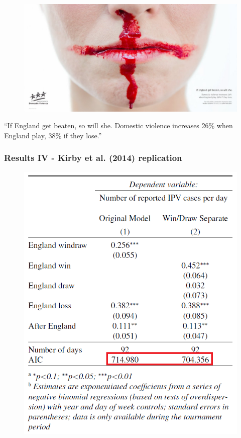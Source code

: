 \documentclass[hyperref={pdfpagelabels=false}]{beamer}
\begin{document}
\begin{frame}
\begin{center}
\begin{figure}
\includegraphics[scale=0.15]{domesticviolence.jpg}
\end{figure}
 ``If England get beaten, so will she. Domestic violence increases 26\% when England play, 38\% if they lose.''
\end{center}
\end{frame}

\begin{frame}
\frametitle{Results IV - Kirby et al. (2014) replication}
\begin{center}
\begin{figure}
\includegraphics[scale=0.45]{result3.png}
\end{figure}
\end{center}
\end{frame}
\end{document}
